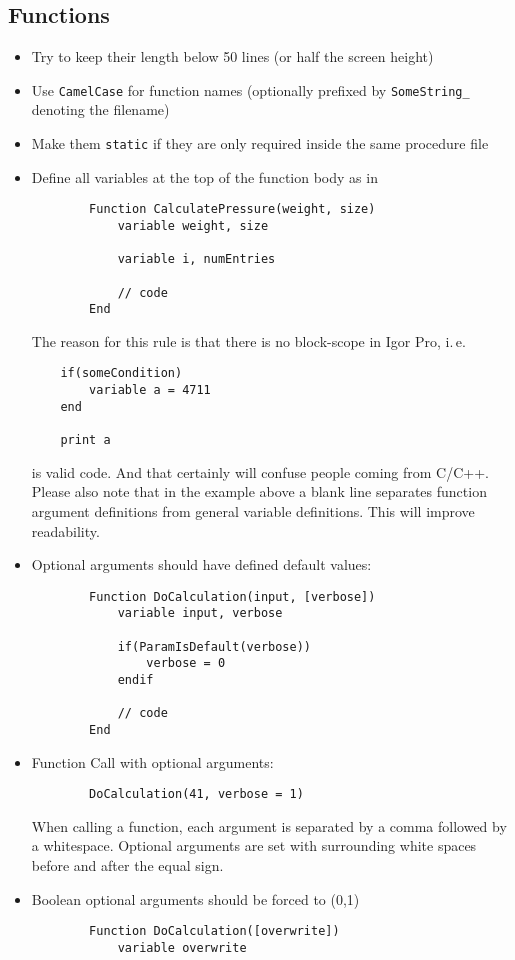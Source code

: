\documentclass{scrartcl}
\begin{document}
\subsection{Functions}
\begin{itemize}
	\item Try to keep their length below 50 lines (or half the screen height)
%
	\item Use \texttt{CamelCase} for function names (optionally prefixed by \texttt{SomeString_} denoting the filename)
%
	\item Make them \texttt{static} if they are only required inside the same procedure file
%
	\item Define all variables at the top of the function body as in
	\begin{verbatim}
		Function CalculatePressure(weight, size)
			variable weight, size

			variable i, numEntries

			// code
		End
	\end{verbatim}
	The reason for this rule is that there is no block-scope in Igor Pro, i.\,e.
	\begin{verbatim}
	if(someCondition)
		variable a = 4711
	end

	print a
	\end{verbatim}
	is valid code. And that certainly will confuse people coming from C/C++.\\
%
	Please also note that in the example above a blank line separates function argument definitions from general variable definitions.
	This will improve readability.
%
	\item Optional arguments should have defined default values:
	\begin{verbatim}
		Function DoCalculation(input, [verbose])
			variable input, verbose

			if(ParamIsDefault(verbose))
				verbose = 0
			endif

			// code
		End
	\end{verbatim}
%
	\item Function Call with optional arguments:
	\begin{verbatim}
		DoCalculation(41, verbose = 1)
	\end{verbatim}
		When calling a function, each argument is separated by a comma followed by a whitespace.
		Optional arguments are set with surrounding white spaces before and after the equal sign.
	\item Boolean optional arguments should be forced to (0,1)
	\begin{verbatim}
		Function DoCalculation([overwrite])
			variable overwrite


\end{verbatim}
\end{itemize}
\end{document}
